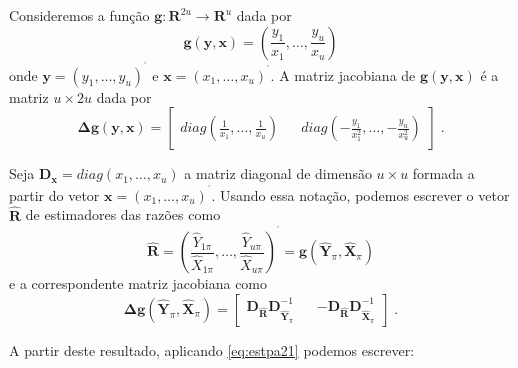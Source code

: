 \documentclass[]{book}
\numberwithin{example}{chapter}
\numberwithin{remark}{chapter}
\numberwithin{definition}{chapter}
\begin{document}
Consideremos a função
\(\mathbf{g}:\textbf{R}^{2u}\rightarrow \textbf{R}^{u}\) dada por \[
\mathbf{g}\left( \mathbf{y},\mathbf{x}\right) =\left( \frac{y_{1}}{x_{1}},\ldots ,\frac{y_{u}}{x_{u}}\right) 
\] onde \(\mathbf{y=}\left( y_{1},\ldots ,y_{u}\right) ^{^{\prime }}\) e
\(\mathbf{x=}\left( x_{1},\ldots,x_{u}\right) ^{^{\prime }}\). A matriz
jacobiana de \(\mathbf{g}\left( \mathbf{y},\mathbf{x}\right)\) é a
matriz \(u\times 2u\) dada por \[
\mathbf{\Delta g}\left( \mathbf{y},\mathbf{x}\right) =\left[ 
\begin{array}{lll}
diag\left( \frac{1}{x_{1}},\ldots ,\frac{1}{x_{u}}\right) &  & diag\left( -\frac{y_{1}}{x_{1}^{2}},\ldots ,-\frac{y_{u}}{x_{u}^{2}}\right)
\end{array}
\right] \;\mbox{.} 
\]

Seja \(\mathbf{D}_{\mathbf{x}}=diag(x_{1},\ldots ,x_{u})\) a matriz
diagonal de dimensão \(u\times u\) formada a partir do vetor
\(\mathbf{x=}\left( x_{1},\ldots ,x_{u}\right) ^{^{\prime }}\). Usando
essa notação, podemos escrever o vetor \(\widehat{\mathbf{R}}\) de
estimadores das razões como \[
\widehat{\mathbf{R}}\mathbf{=}\left( \frac{\hat{Y}_{1\pi }}{\hat{X}_{1\pi }},\ldots ,\frac{\hat{Y}_{u\pi }}{\hat{X}_{u\pi }}\right) ^{^{\prime }}=\mathbf{g}\left( \mathbf{\hat{Y}}_{\pi },\mathbf{\hat{X}}_{\pi }\right)
\] e a correspondente matriz jacobiana como \[
\mathbf{\Delta g}\left( \mathbf{\hat{Y}}_{\pi },\mathbf{\hat{X}}_{\pi
}\right) =\left[ \begin{array}{lll}
\mathbf{\mathbf{D}_{\widehat{\mathbf{R}}}D}_{\mathbf{\hat{Y}}_{\pi }}^{-1} &\left. {}\right. & \mathbf{-\mathbf{D}_{\widehat{\mathbf{R}}}D}_{\mathbf{\hat{X}}_{\pi }}^{-1}
\end{array}
\right] \;. 
\]

A partir deste resultado, aplicando \eqref{eq:estpa21} podemos escrever:
\end{document}
